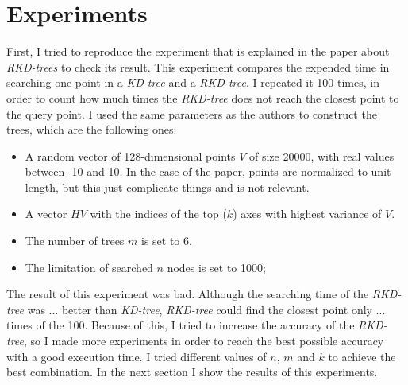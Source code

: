 \section{Experiments}
First, I tried to reproduce the experiment that is explained in the paper about \textit{RKD-trees} to check its result. This experiment compares the  expended time in searching one point in a \textit{KD-tree} and a \textit{RKD-tree}. I repeated it 100 times, in order to count how much times the \textit{RKD-tree} does not reach the closest point to the query point. I used the same parameters as the authors to construct the trees, which are the following ones:
\begin{itemize}
    \item A random vector of 128-dimensional points $V$ of size 20000, with real values between -10 and 10. In the case of the paper, points are normalized to unit length, but this just complicate things and is not relevant.
    \item A vector $HV$ with the indices of the top ($k$) axes with highest variance of $V$.
    \item The number of trees $m$ is set to 6.
    \item The limitation of searched $n$ nodes is set to 1000;
\end{itemize}

The result of this experiment was bad. Although the searching time of the \textit{RKD-tree} was ... better than \textit{KD-tree}, \textit{RKD-tree} could find the closest point only ... times of the 100. Because of this, I tried to increase the accuracy of the \textit{RKD-tree}, so I made more experiments in order to reach the best possible accuracy with a good execution time. I tried different values of $n$, $m$ and $k$ to achieve the best combination. In the next section I show the results of this experiments.
